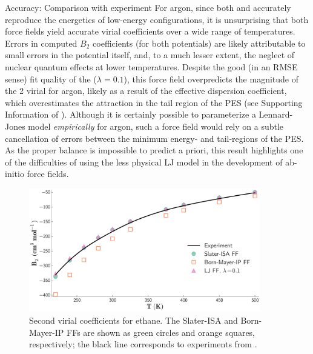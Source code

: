 \begin{subsection}{Accuracy: Comparison with experiment}
For argon, since both \isaffold and \saptff accurately reproduce the energetics 
of low-energy configurations, it
is unsurprising that both force fields yield accurate virial
coefficients over a wide range of temperatures.  Errors in computed $B_2$
coefficients (for both potentials) are likely attributable to small errors in
the \saptpbeo potential itself,
\cite{Podeszwa2005a}
and, to a much lesser extent, the neglect of nuclear
quantum effects at lower temperatures.
\cite{Vogel2010}
Despite the good (in an RMSE sense) fit quality of the \ljff ($\lambda=0.1$),
this force field overpredicts the magnitude of the 2 virial for argon, likely as a
result of the effective dispersion coefficient, which overestimates the
attraction in the tail
region of the PES (see Supporting Information of ). Although it is certainly
possible to parameterize a Lennard-Jones model \emph{empirically} for argon,
such a force field would rely on a subtle cancellation of errors between the
minimum energy- and tail-regions of the PES. As the proper balance is
impossible to predict a priori, this result highlights one of the difficulties
of using the less physical LJ model in the development of ab-initio force
fields.

%
    \begin{figure}
    \includegraphics[width=0.9\textwidth]{isotropic/ethane_2nd_virial_wi_lj.pdf}
   \caption{
    Second virial coefficients for ethane. 
    The Slater-ISA and Born-Mayer-IP FFs are shown as green
    circles and orange squares, respectively; the black line corresponds to
    experiments from .
    }
    \label{fig:isotropic-ethane-virial}
    \end{figure}
%


\end{subsection}
